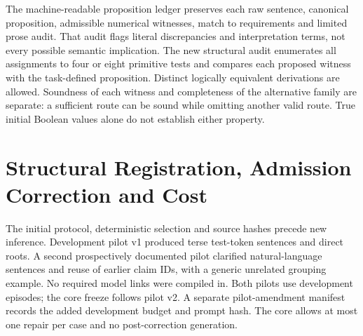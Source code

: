\documentclass[runningheads]{llncs}
\newcommand{\suppTable}[3]{\begin{table}[!ht]\caption{#2}\label{#3}\centering\scriptsize
\setlength{\tabcolsep}{3pt}\end{table}}
\begin{document}
\suppTable{generated/semantic/crosswalk_table}{New semantic protocol versus the
unchanged B0 contract outcomes. Grounded background is a subset of grounded
formerly invalid content. The remaining disagreements include scope/dependency
and citation admission restrictions; no old valid claim becomes ungrounded.}{tab:crosswalk}
\suppTable{generated/semantic/competency_table}{Independent competency checks on
displayed M1 waveform claims. Each eligible comparison must expose both operands;
known-version and source-window answers are checked against immutable events.
Alternative-support behavior is tested separately in the structural experiment.}{tab:competency}
\suppTable{generated/semantic/temporal_table}{Event-aligned M1 prior-answer
checkpoints across all variants. Each source/position has 160 transitions from
20 episodes and ten subjects. Intervals are subject-cluster 95\% intervals.
No continuous-time loss or finite recovery time is inferred from these points.}{tab:temporal}

The machine-readable proposition ledger preserves each raw sentence, canonical
proposition, admissible numerical witnesses, match to requirements and limited
prose audit. That audit flags literal discrepancies and interpretation terms,
not every possible semantic implication. The new structural audit enumerates all
assignments to four or eight primitive tests and compares each proposed witness
with the task-defined proposition. Distinct logically equivalent derivations
are allowed. Soundness of each witness and completeness of the alternative
family are separate: a sufficient route can be sound while omitting another
valid route. True initial Boolean values alone do not establish either property.

\suppTable{generated/semantic/program_fidelity}{Structural candidate semantics:
initial propositions are true in all cases; witness soundness and answer-root coverage with
an admissible witness. Entries are percentages with subject-cluster intervals;
each source/stage has 80 cases from ten reused episodes and five subjects.
Accepted/displayed refers to original extension admission. Primitive test names
are normalized for independent proposition truth, not silently admitted.}{tab:programfidelity}

\section{Structural Registration, Admission Correction and Cost}

The initial protocol, deterministic selection and source hashes precede new
inference. Development pilot v1 produced terse test-token sentences and direct
roots. A second prospectively documented pilot clarified natural-language
sentences and reuse of earlier claim IDs, with a generic unrelated grouping
example. No required model links were compiled in. Both pilots use development
episodes; the core freeze follows pilot v2. A separate pilot-amendment manifest
records the added development budget and prompt hash. The core allows at most
one repair per case and no post-correction generation.
\end{document}

